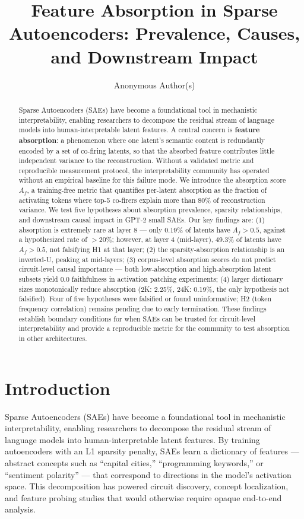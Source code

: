 \documentclass{article}
\title{Feature Absorption in Sparse Autoencoders: Prevalence, Causes, and Downstream Impact}
\author{Anonymous Author(s)}
\begin{document}
\maketitle

\begin{abstract}
Sparse Autoencoders (SAEs) have become a foundational tool in mechanistic interpretability, enabling researchers to decompose the residual stream of language models into human-interpretable latent features. A central concern is \textbf{feature absorption}: a phenomenon where one latent's semantic content is redundantly encoded by a set of co-firing latents, so that the absorbed feature contributes little independent variance to the reconstruction. Without a validated metric and reproducible measurement protocol, the interpretability community has operated without an empirical baseline for this failure mode. We introduce the absorption score $A_f$, a training-free metric that quantifies per-latent absorption as the fraction of activating tokens where top-5 co-firers explain more than 80\% of reconstruction variance. We test five hypotheses about absorption prevalence, sparsity relationships, and downstream causal impact in GPT-2 small SAEs. Our key findings are: (1) absorption is extremely rare at layer 8 --- only 0.19\% of latents have $A_f > 0.5$, against a hypothesized rate of $>20\%$; however, at layer 4 (mid-layer), 49.3\% of latents have $A_f > 0.5$, not falsifying H1 at that layer; (2) the sparsity-absorption relationship is an inverted-U, peaking at mid-layers; (3) corpus-level absorption scores do not predict circuit-level causal importance --- both low-absorption and high-absorption latent subsets yield 0.0 faithfulness in activation patching experiments; (4) larger dictionary sizes monotonically reduce absorption (2K: 2.25\%, 24K: 0.19\%, the only hypothesis not falsified). Four of five hypotheses were falsified or found uninformative; H2 (token frequency correlation) remains pending due to early termination. These findings establish boundary conditions for when SAEs can be trusted for circuit-level interpretability and provide a reproducible metric for the community to test absorption in other architectures.
\end{abstract}


\section{Introduction}

Sparse Autoencoders (SAEs) have become a foundational tool in mechanistic interpretability, enabling researchers to decompose the residual stream of language models into human-interpretable latent features. By training autoencoders with an L1 sparsity penalty, SAEs learn a dictionary of features --- abstract concepts such as ``capital cities,'' ``programming keywords,'' or ``sentiment polarity'' --- that correspond to directions in the model's activation space. This decomposition has powered circuit discovery, concept localization, and feature probing studies that would otherwise require opaque end-to-end analysis.
\end{document}
